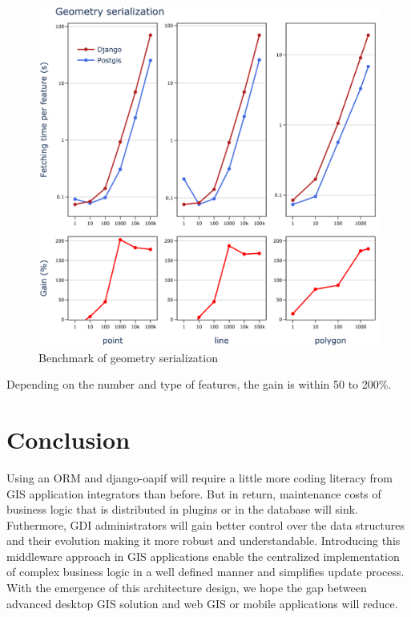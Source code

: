 \documentclass[runningheads]{llncs}
\begin{document}
\begin{figure}
	\includegraphics[width=\textwidth]{benchmarckb.png}
	\caption{Benchmark of geometry serialization} \label{fig6}
\end{figure}

Depending on the number and type of features, the gain is within 50 to 200\%.


\section{Conclusion}

Using an ORM and django-oapif will require a little more coding literacy from GIS application integrators than before. But in return, maintenance costs of business logic that is distributed in plugins or in the database will sink. Futhermore, GDI administrators will gain better control over the data structures and their evolution making it more robust and understandable. Introducing this middleware approach in GIS applications enable the centralized implementation of complex business logic in a  well defined manner and simplifies update process. With the emergence of this architecture design, we hope the gap between advanced desktop GIS solution and web GIS or mobile applications will reduce.
\end{document}
